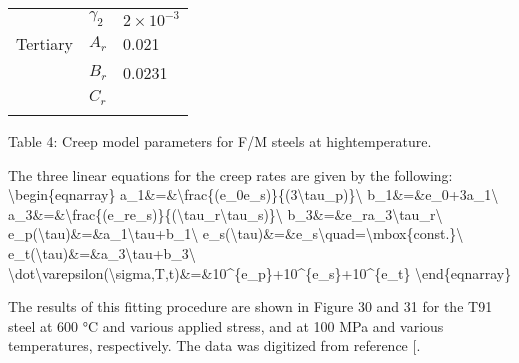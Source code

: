\documentclass[letterpaper,10pt,english]{jupyterBook}
\begin{document}
\begin{savenotes}
\begin{tabulary}{\linewidth}[t]{TTT}
			&
			\sphinxAtStartPar
			\(\gamma_2\)
			&
			\sphinxAtStartPar
			\(2\times 10^{-3}\)
			\\
			\sphinxhline
			\sphinxAtStartPar
			Tertiary
			&
			\sphinxAtStartPar
			\(A_r\)
			&
			\sphinxAtStartPar
			\sphinxhyphen{}0.021
			\\
			\sphinxhline
			\sphinxAtStartPar
			
			&
			\sphinxAtStartPar
			\(B_r\)
			&
			\sphinxAtStartPar
			\sphinxhyphen{}0.0231
			\\
			\sphinxhline
			\sphinxAtStartPar
			
			&
			\sphinxAtStartPar
			\(C_r\)
			&
			\\
			\sphinxbottomrule
		\end{tabulary}
		\sphinxtableafterendhook\par
		\sphinxattableend\end{savenotes}
	
	\sphinxAtStartPar
	Table 4: Creep model parameters for F/M steels at high\sphinxhyphen{}temperature.
	
	\sphinxAtStartPar
	The three linear equations for the creep rates are given by the following:
	\textbackslash{}begin\{eqnarray\}
	a\_1\&=\&\textbackslash{}frac\{(e\_0\sphinxhyphen{}e\_s)\}\{(\sphinxhyphen{}3\sphinxhyphen{}\textbackslash{}tau\_p)\}\textbackslash{}
	b\_1\&=\&e\_0+3a\_1\textbackslash{}
	a\_3\&=\&\textbackslash{}frac\{(e\_r\sphinxhyphen{}e\_s)\}\{(\textbackslash{}tau\_r\sphinxhyphen{}\textbackslash{}tau\_s)\}\textbackslash{}
	b\_3\&=\&e\_r\sphinxhyphen{}a\_3\textbackslash{}tau\_r\textbackslash{}
	e\_p(\textbackslash{}tau)\&=\&a\_1\textbackslash{}tau+b\_1\textbackslash{}
	e\_s(\textbackslash{}tau)\&=\&e\_s\textbackslash{}quad=\textbackslash{}mbox\{const.\}\textbackslash{}
	e\_t(\textbackslash{}tau)\&=\&a\_3\textbackslash{}tau+b\_3\textbackslash{}
	\textbackslash{}dot\textbackslash{}varepsilon(\textbackslash{}sigma,T,t)\&=\&10\textasciicircum{}\{e\_p\}+10\textasciicircum{}\{e\_s\}+10\textasciicircum{}\{e\_t\}
	\textbackslash{}end\{eqnarray\}
	
	\sphinxAtStartPar
	The results of this fitting procedure are shown in Figure 30 and 31 for the T91 steel at 600 °C and various applied stress, and at 100 MPa and various temperatures, respectively. The data was digitized from reference {[}\sphinxhref{https://drive.google.com/file/d/142veTwOcleO7bb8oWHEaCu9fhHGYmhdf/view?usp=drive\_link}{Shrestha2013}{]}.
	
\end{document}
